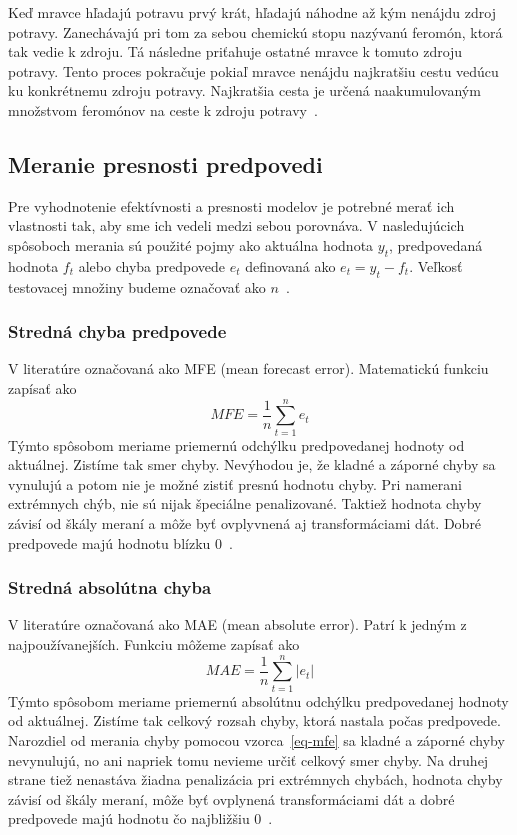 \documentclass[a4paper,slovak,12pt,appendix]{article}
\begin{document}
Keď mravce hľadajú potravu prvý krát, hľadajú náhodne až kým nenájdu zdroj
potravy. Zanechávajú pri tom za sebou chemickú stopu nazývanú feromón, ktorá
tak vedie k zdroju. Tá následne priťahuje ostatné mravce k tomuto zdroju
potravy. Tento proces pokračuje pokiaľ mravce nenájdu najkratšiu cestu vedúcu
ku konkrétnemu zdroju potravy. Najkratšia cesta je určená naakumulovaným
množstvom feromónov na ceste k zdroju potravy~\cite{Buhussain2016}.


\subsection{Meranie presnosti predpovedi}
Pre vyhodnotenie efektívnosti a presnosti modelov je potrebné merať ich
vlastnosti tak, aby sme ich vedeli medzi sebou porovnáva. V nasledujúcich
spôsoboch merania sú použité pojmy ako aktuálna hodnota $y_t$, predpovedaná
hodnota $f_t$ alebo chyba predpovede $e_t$ definovaná ako $e_t = y_t - f_t$.
Veľkosť testovacej množiny budeme označovať ako $n$~\cite{Agrawal2013}.

\subsubsection{Stredná chyba predpovede}
V literatúre označovaná ako MFE (mean forecast error). Matematickú funkciu
zapísať ako
\begin{equation}
  MFE = \frac{1}{n} \sum_{t=1}^{n} e_t
  \label{eq-mfe}
\end{equation}
Týmto spôsobom meriame priemernú odchýlku predpovedanej hodnoty od aktuálnej.
Zistíme tak smer chyby. Nevýhodou je, že kladné a záporné chyby sa vynulujú
a potom nie je možné zistiť presnú hodnotu chyby. Pri namerani extrémnych chýb,
nie sú nijak špeciálne penalizované. Taktiež hodnota chyby závisí od škály
meraní a môže byť ovplyvnená aj transformáciami dát. Dobré predpovede majú
hodnotu blízku 0~\cite{Agrawal2013}.

\subsubsection{Stredná absolútna chyba}
V literatúre označovaná ako MAE (mean absolute error). Patrí k jedným
z najpoužívanejších. Funkciu môžeme zapísať ako
\begin{equation}
  MAE = \frac{1}{n} \sum_{t=1}^{n} |e_t|
  \label{eq-mae}
\end{equation}
Týmto spôsobom meriame priemernú absolútnu odchýlku predpovedanej hodnoty od
aktuálnej. Zistíme tak celkový rozsah chyby, ktorá nastala počas predpovede.
Narozdiel od merania chyby pomocou vzorca~\ref{eq-mfe} sa kladné a záporné
chyby nevynulujú, no ani napriek tomu nevieme určiť celkový smer chyby.
Na druhej strane tiež nenastáva žiadna penalizácia pri extrémnych chybách,
hodnota chyby závisí od škály meraní, môže byť ovplynená transformáciami dát
a dobré predpovede majú hodnotu čo
najbližšiu 0~\cite{Agrawal2013, Gutierrez2015}.
\end{document}
